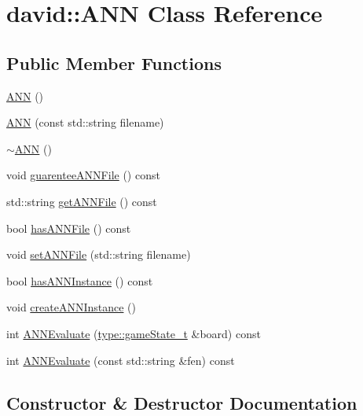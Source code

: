 \hypertarget{classdavid_1_1ANN}{}\section{david\+:\+:A\+NN Class Reference}
\label{classdavid_1_1ANN}
\subsection*{Public Member Functions}
\begin{DoxyCompactItemize}
\item 
\hyperlink{classdavid_1_1ANN_a9bfc4e7df759ece344ee482f2652b2af}{A\+NN} ()
\item 
\hyperlink{classdavid_1_1ANN_a7c53c4d31d9af4d5ae48c176c1565956}{A\+NN} (const std\+::string filename)
\item 
\hyperlink{classdavid_1_1ANN_a16c81190a4d252b98e7646aef0292439}{$\sim$\+A\+NN} ()
\item 
void \hyperlink{classdavid_1_1ANN_a13b9362aa75a05db1e1786d9ab28ca9e}{guarentee\+A\+N\+N\+File} () const
\item 
std\+::string \hyperlink{classdavid_1_1ANN_aeef8f4fa5ab8fabf79db1351137322a6}{get\+A\+N\+N\+File} () const
\item 
bool \hyperlink{classdavid_1_1ANN_a41cd1506fa1d9c4a92f356689ba3160e}{has\+A\+N\+N\+File} () const
\item 
void \hyperlink{classdavid_1_1ANN_a5a25f7fb14c8681f7fcbda5d447b0a8e}{set\+A\+N\+N\+File} (std\+::string filename)
\item 
bool \hyperlink{classdavid_1_1ANN_a0e3b3e683ad786e3ac5f08e26ddcd4ce}{has\+A\+N\+N\+Instance} () const
\item 
void \hyperlink{classdavid_1_1ANN_ae5308d097ec9e78a740e24024dee5315}{create\+A\+N\+N\+Instance} ()
\item 
int \hyperlink{classdavid_1_1ANN_a896974d5b624e63b67cff602fa4b75ee}{A\+N\+N\+Evaluate} (\hyperlink{structdavid_1_1bitboard_1_1gameState}{type\+::game\+State\+\_\+t} \&board) const
\item 
int \hyperlink{classdavid_1_1ANN_a1c35d108904a12b8994b98d92fd7ffc4}{A\+N\+N\+Evaluate} (const std\+::string \&fen) const
\end{DoxyCompactItemize}


\subsection{Constructor \& Destructor Documentation}
\mbox{\label{classdavid_1_1ANN_a9bfc4e7df759ece344ee482f2652b2af}} 

